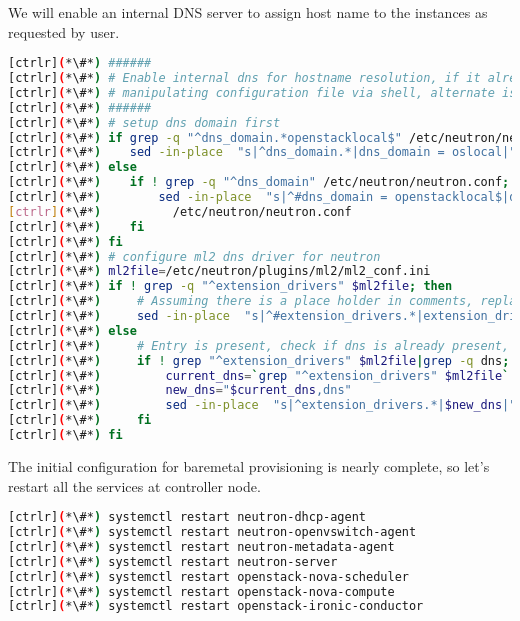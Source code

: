 	We will enable an internal DNS server to assign host name to the instances as requested by user. 


\begin{lstlisting}[language=bash,keywords={}]
[ctrlr](*\#*) ######
[ctrlr](*\#*) # Enable internal dns for hostname resolution, if it already not set
[ctrlr](*\#*) # manipulating configuration file via shell, alternate is to use openstack-config 
[ctrlr](*\#*) ######
[ctrlr](*\#*) # setup dns domain first
[ctrlr](*\#*) if grep -q "^dns_domain.*openstacklocal$" /etc/neutron/neutron.conf; then
[ctrlr](*\#*)    sed -in-place  "s|^dns_domain.*|dns_domain = oslocal|" /etc/neutron/neutron.conf
[ctrlr](*\#*) else
[ctrlr](*\#*)    if ! grep -q "^dns_domain" /etc/neutron/neutron.conf; then
[ctrlr](*\#*)        sed -in-place  "s|^#dns_domain = openstacklocal$|dns_domain = oslocal|" \
[ctrlr](*\#*)          /etc/neutron/neutron.conf
[ctrlr](*\#*)    fi
[ctrlr](*\#*) fi
[ctrlr](*\#*) # configure ml2 dns driver for neutron
[ctrlr](*\#*) ml2file=/etc/neutron/plugins/ml2/ml2_conf.ini
[ctrlr](*\#*) if ! grep -q "^extension_drivers" $ml2file; then
[ctrlr](*\#*)     # Assuming there is a place holder in comments, replace that string
[ctrlr](*\#*)     sed -in-place  "s|^#extension_drivers.*|extension_drivers = port_security,dns|" $ml2file
[ctrlr](*\#*) else
[ctrlr](*\#*)     # Entry is present, check if dns is already present, if not then enable
[ctrlr](*\#*)     if ! grep "^extension_drivers" $ml2file|grep -q dns; then
[ctrlr](*\#*)         current_dns=`grep "^extension_drivers" $ml2file`
[ctrlr](*\#*)         new_dns="$current_dns,dns"
[ctrlr](*\#*)         sed -in-place  "s|^extension_drivers.*|$new_dns|" $ml2file
[ctrlr](*\#*)     fi
[ctrlr](*\#*) fi
\end{lstlisting} 

	The initial configuration for baremetal provisioning is nearly complete, so let's restart all the services at controller node.


\begin{lstlisting}[language=bash,keywords={}]
[ctrlr](*\#*) systemctl restart neutron-dhcp-agent
[ctrlr](*\#*) systemctl restart neutron-openvswitch-agent
[ctrlr](*\#*) systemctl restart neutron-metadata-agent
[ctrlr](*\#*) systemctl restart neutron-server
[ctrlr](*\#*) systemctl restart openstack-nova-scheduler
[ctrlr](*\#*) systemctl restart openstack-nova-compute
[ctrlr](*\#*) systemctl restart openstack-ironic-conductor
\end{lstlisting} 
